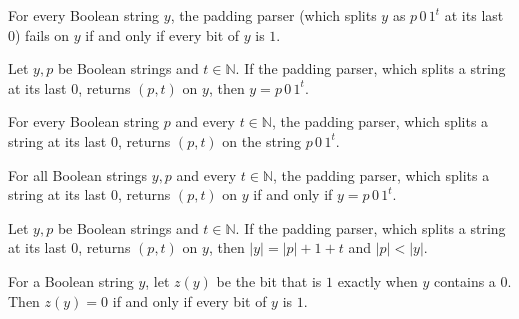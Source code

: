 \begin{theorem}
\label{Complexity.ladner_parse_none}
\leanok
{}
For every Boolean string $y$, the padding parser (which splits $y$ as $p\,0\,1^t$ at its
last $0$) fails on $y$ if and only if every bit of $y$ is $1$.
\end{theorem}

\begin{theorem}
\label{Complexity.ladner_parse_sound}
\leanok
{}
Let $y,p$ be Boolean strings and $t\in\mathbb N$. If the padding parser, which splits a
string at its last $0$, returns $(p,t)$ on $y$, then $y=p\,0\,1^t$.
\end{theorem}

\begin{theorem}
\label{Complexity.ladner_parse_pad}
\leanok
{}
For every Boolean string $p$ and every $t\in\mathbb N$, the padding parser, which splits a
string at its last $0$, returns $(p,t)$ on the string $p\,0\,1^t$.
\end{theorem}

\begin{theorem}
\label{Complexity.ladner_parse_some}
\leanok
{}
For all Boolean strings $y,p$ and every $t\in\mathbb N$, the padding parser, which splits a
string at its last $0$, returns $(p,t)$ on $y$ if and only if $y=p\,0\,1^t$.
\end{theorem}

\begin{theorem}
\label{Complexity.ladner_parsed_length}
\leanok
{}
Let $y,p$ be Boolean strings and $t\in\mathbb N$. If the padding parser, which splits a
string at its last $0$, returns $(p,t)$ on $y$, then $|y|=|p|+1+t$ and $|p|<|y|$.
\end{theorem}

\begin{theorem}
\label{Complexity.ladner_hasFalse_false}
\leanok
{}
For a Boolean string $y$, let $z(y)$ be the bit that is $1$ exactly when $y$ contains a
$0$. Then $z(y)=0$ if and only if every bit of $y$ is $1$.
\end{theorem}

